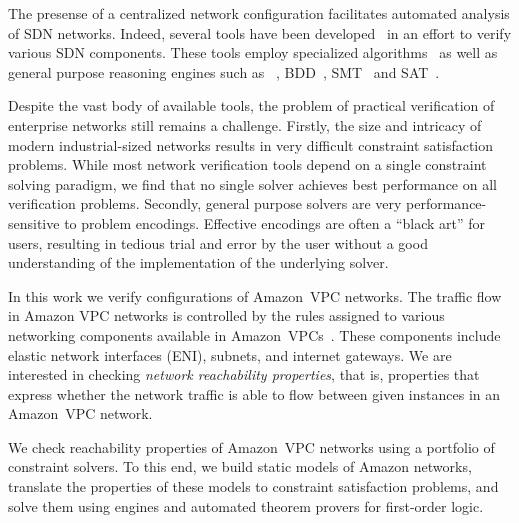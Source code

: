 The presense of a centralized network configuration facilitates automated analysis of SDN networks. Indeed, several tools have been 
developed~\cite{batfish,jayaraman2014automated,DBLP:conf/icdcit/BjornerJ15,DBLP:conf/pldi/BallBGIKSSV14,Veriflow,ConfigChecker,Anteater,DBLP:conf/cav/El-HassanyTVV17} in an effort to verify various SDN components. These tools employ specialized algorithms~\cite{Veriflow} as well as general purpose 
reasoning engines such as 
\Datalog~\cite{muZ, DBLP:conf/cav/El-HassanyTVV17}, BDD~\cite{ConfigChecker}, SMT~\cite{jayaraman2014automated,DBLP:conf/icdcit/BjornerJ15} 
and SAT~\cite{Anteater,DBLP:conf/pldi/BallBGIKSSV14}.

%
%
Despite the vast body of available tools, the problem of practical verification of enterprise networks still remains a 
challenge. Firstly, the size and intricacy of modern industrial-sized networks results in very difficult constraint 
satisfaction problems. While most network verification 
tools depend on a single constraint solving paradigm, we find that no single solver achieves best performance on all 
verification problems. Secondly, general purpose solvers are very 
performance-sensitive to problem encodings. Effective encodings are often a ``black art'' for users, resulting in tedious trial 
and error by the user without a good understanding of the implementation of the underlying solver.

%
%
In this work we verify configurations of Amazon~VPC networks. The traffic flow in Amazon VPC networks is controlled by the rules assigned to various networking components available in Amazon~VPCs~\cite{WhatIsAmazonVPC}. These components include elastic network interfaces (ENI), subnets, and internet gateways. We are interested in checking \emph{network reachability properties}, that is, properties that express whether the network traffic is able to flow between given instances in an Amazon~VPC network.

We check reachability properties of Amazon~VPC networks using a portfolio of constraint solvers. To this end, we build static models of Amazon networks, translate the properties of these models to constraint satisfaction problems, and solve them using \Datalog engines and automated theorem provers for first-order logic.

